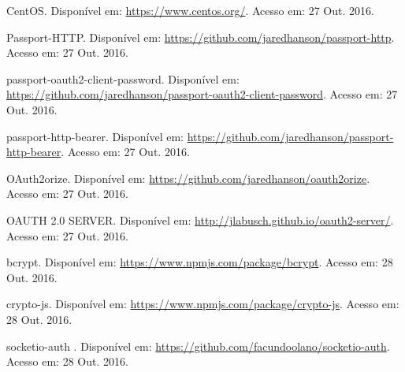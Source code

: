 \documentclass[brazil,ruledheader]{abntifes}
\begin{document}
\begin{thebibliography}{9}
		CentOS. Disponível em: \url{https://www.centos.org/}.
		Acesso em: 27 Out. 2016.
		
		Passport-HTTP. Disponível em: \url{https://github.com/jaredhanson/passport-http}.
		Acesso em: 27 Out. 2016.
		
		passport-oauth2-client-password. Disponível em: \url{https://github.com/jaredhanson/passport-oauth2-client-password}.
		Acesso em: 27 Out. 2016.
		
		passport-http-bearer. Disponível em: \url{https://github.com/jaredhanson/passport-http-bearer}.
		Acesso em: 27 Out. 2016.
		
		OAuth2orize. Disponível em: \url{https://github.com/jaredhanson/oauth2orize}.
		Acesso em: 27 Out. 2016.
		
		OAUTH 2.0 SERVER. Disponível em: \url{http://jlabusch.github.io/oauth2-server/}.
		Acesso em: 27 Out. 2016.
		
		bcrypt. Disponível em: \url{https://www.npmjs.com/package/bcrypt}.
		Acesso em: 28 Out. 2016.
		
		crypto-js. Disponível em: \url{https://www.npmjs.com/package/crypto-js}.
		Acesso em: 28 Out. 2016.
		
		socketio-auth . Disponível em: \url{https://github.com/facundoolano/socketio-auth}.
		Acesso em: 28 Out. 2016.
	\end{thebibliography}
		\anexo
		
	
\end{document}
